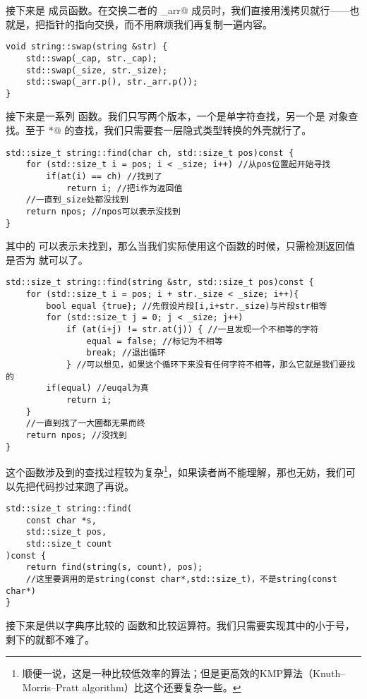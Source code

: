 接下来是 \lstinline@swap@ 成员函数。在交换二者的 \lstinline@_arr@ 成员时，我们直接用浅拷贝就行——也就是，把指针的指向交换，而不用麻烦我们再复制一遍内容。\par
\begin{lstlisting}
void string::swap(string &str) {
    std::swap(_cap, str._cap);
    std::swap(_size, str._size);
    std::swap(_arr.p(), str._arr.p());
}
\end{lstlisting}\par
接下来是一系列 \lstinline@find@ 函数。我们只写两个版本，一个是单字符查找，另一个是 \lstinline@string@ 对象查找。至于 \lstinline@char*@ 的查找，我们只需要套一层隐式类型转换的外壳就行了。
\begin{lstlisting}
std::size_t string::find(char ch, std::size_t pos)const {
    for (std::size_t i = pos; i < _size; i++) //从pos位置起开始寻找
        if(at(i) == ch) //找到了
            return i; //把i作为返回值
    //一直到_size处都没找到
    return npos; //npos可以表示没找到
}
\end{lstlisting}
其中的 \lstinline@npos@ 可以表示未找到，那么当我们实际使用这个函数的时候，只需检测返回值是否为 \lstinline@npos@ 就可以了。
\begin{lstlisting}
std::size_t string::find(string &str, std::size_t pos)const {
    for (std::size_t i = pos; i + str._size < _size; i++){
        bool equal {true}; //先假设片段[i,i+str._size)与片段str相等
        for (std::size_t j = 0; j < _size; j++)
            if (at(i+j) != str.at(j)) { //一旦发现一个不相等的字符
                equal = false; //标记为不相等
                break; //退出循环
            } //可以想见，如果这个循环下来没有任何字符不相等，那么它就是我们要找的
        if(equal) //euqal为真
            return i;
    }
    //一直到找了一大圈都无果而终
    return npos; //没找到
}
\end{lstlisting}
这个函数涉及到的查找过程较为复杂\footnote{顺便一说，这是一种比较低效率的算法；但是更高效的KMP算法（Knuth–Morris–Pratt algorithm）比这个还要复杂一些。}，如果读者尚不能理解，那也无妨，我们可以先把代码抄过来跑了再说。
\begin{lstlisting}
std::size_t string::find(
    const char *s,
    std::size_t pos,
    std::size_t count
)const {
    return find(string(s, count), pos);
    //这里要调用的是string(const char*,std::size_t)，不是string(const char*)
}
\end{lstlisting}\par
接下来是供以字典序比较的 \lstinline@compare@ 函数和比较运算符。我们只需要实现其中的小于号，剩下的就都不难了。
